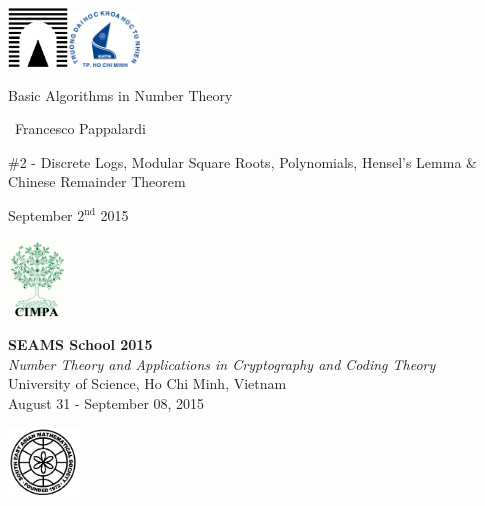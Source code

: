 \documentclass[landscape]{powersem} %
\begin{document}

\begin{slide}
\includegraphics[width=1.6cm]{images/roma3.pdf}\hfill\includegraphics[width=1.9cm]{images/HCMCUS.jpeg}
\vfill

\begin{center}\begin{sc}
\begin{Large}

\textcolor{underlcolor}{Basic Algorithms in Number Theory}
\end{Large}\bigskip

\ {Francesco Pappalardi}\bigskip\bigskip

\begin{large}\begin{bf}\#2 - Discrete Logs, Modular Square Roots, Polynomials, Hensel's Lemma \& Chinese Remainder Theorem
\end{bf}\end{large}\medskip

September $2^{\textrm{nd}}$ 2015\medskip
\vfill
\vfil\end{sc}\end{center}
\begin{scriptsize}
 \includegraphics[width=1.6cm]{images/cimpalogo.pdf}\hfill
\begin{minipage}[b]{7cm}
\textbf{SEAMS School 2015}\\
\textit{Number Theory and Applications in Cryptography and Coding Theory}\\
University of Science, Ho Chi Minh, Vietnam\\
August 31 - September 08, 2015
\end{minipage}\hfill
\includegraphics[width=1.9cm]{images/seams.png}
\end{scriptsize}
\end{slide}
\end{document}
